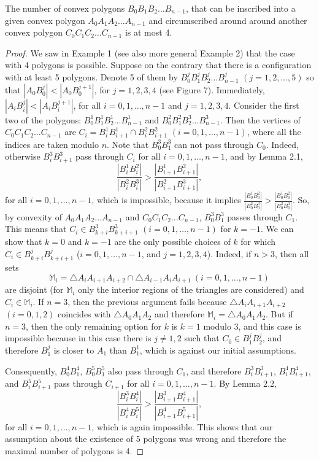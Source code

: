 \documentclass[10pt,a4paper]{amsart}
\begin{document}
\begin{theorem}
The number of convex polygons $B_0 B_1 B_2\ldots B_{n-1}$, that can be inscribed into a given convex polygon $A_0 A_1 A_2\ldots A_{n-1}$ and circumscribed around around another convex polygon $C_0 C_1 C_2\dots C_{n-1}$ is at most 4.
\end{theorem}

\begin{proof}
We saw in Example 1 (see also more general Example 2) that the case with 4 polygons is possible. Suppose on the contrary that there is a configuration with at least 5 polygons. Denote 5 of them by $B^j_0 B^j_1 B^j_2\ldots B^j_{n-1}$ $(j=1,2,\ldots,5)$ so that $|A_0B^j_0|<|A_0B^{j+1}_0|$, for $j=1,2,3,4$ (see Figure 7). Immediately, $|A_iB^j_i|<|A_iB^{j+1}_i|$, for all $i=0,1,\ldots,n-1$ and $j=1,2,3,4$. Consider the first two of the polygons: $B^1_0 B^1_1 B^1_2\ldots B^1_{n-1}$ and $B^{2}_0 B^{2}_1 B^{3}_2\ldots B^{3}_{n-1}$.
Then the vertices of $C_0 C_1 C_2\dots C_{n-1}$ are $C_i=B^1_iB^1_{i+1}\cap B^{2}_iB^{2}_{i+1}$ $(i=0,1,\ldots,n-1)$, where all the indices are taken modulo $n$. Note that $B^{3}_0 B^{3}_1$ can not pass through $C_0$. Indeed, otherwise $B^{3}_i B^{3}_{i+1}$ pass through $C_i$ for all $i=0,1,\ldots,n-1$, and by Lemma 2.1,
$$
\frac{|B^1_iB^2_i|}{|B^2_iB^3_i|}>\frac{|B^1_{i+1}B^2_{i+1}|}{|B^2_{i+1}B^3_{i+1}|},
$$
for all $i=0,1,\ldots,n-1$, which is impossible, because it implies $
\frac{|B^1_0B^2_0|}{|B^2_0B^3_0|}>\frac{|B^1_0B^2_0|}{|B^2_0B^3_0|}.
$
So, by convexity of $A_0 A_1 A_2\ldots A_{n-1}$ and $C_0 C_1 C_2\dots C_{n-1}$, $B^{3}_0 B^{3}_1$ passes through $C_1$. This means that $C_i\in B^{3}_{k+i} B^{3}_{k+i+1}$ $(i=0,1,\ldots,n-1)$ for $k=-1$. We can show that $k=0$ and $k=-1$ are the only possible choices of $k$ for which $C_i\in B^{j}_{k+i} B^{j}_{k+i+1}$ ($i=0,1,\ldots,n-1$, and $j=1,2,3,4$).
Indeed, if $n>3$, then all sets $$\mathbb{M}_i=\triangle A_iA_{i+1}A_{i+2}\cap \triangle A_{i-1}A_iA_{i+1}\ (i=0,1,\ldots,n-1)$$ are disjoint (for $\mathbb{M}_i$ only the interior regions of the triangles are considered) and $C_i\in \mathbb{M}_i$. If $n=3$, then the previous argument fails because $\triangle A_iA_{i+1}A_{i+2}$ $(i=0,1,2)$ coincides with $\triangle A_0A_{1}A_{2}$ and therefore $\mathbb{M}_i=\triangle A_0A_{1}A_{2}$. 
But if $n=3$, then the only remaining option for $k$ is $k=1$ modulo 3, and this case is impossible because in this case there is $j\ne 1,2$ such that $C_0\in B^{j}_{1} B^{j}_{2}$, and therefore $B^{j}_{1}$ is closer to $A_1$ than $B^{1}_{1}$, which is against our initial assumptions.

Consequently, $B^{4}_{0} B^{4}_1$, $B^{5}_{0} B^{5}_1$ also pass through $C_{1}$, and therefore $B^{3}_i B^{3}_{i+1}$, $B^{4}_i B^{4}_{i+1}$, and $B^{5}_i B^{5}_{i+1}$ pass through $C_{i+1}$ for all $i=0,1,\ldots,n-1$.
By Lemma 2.2,
$$
\frac{|B^3_{i}B^4_{i}|}{|B^4_{i}B^5_{i}|}>\frac{|B^3_{i+1}B^4_{i+1}|}{|B^4_{i+1}B^5_{i+1}|},
$$
for all $i=0,1,\ldots,n-1$, which is again impossible.
This shows that our assumption about the existence of 5 polygons was wrong and therefore the maximal number of polygons is 4.
\end{proof}
\end{document}
